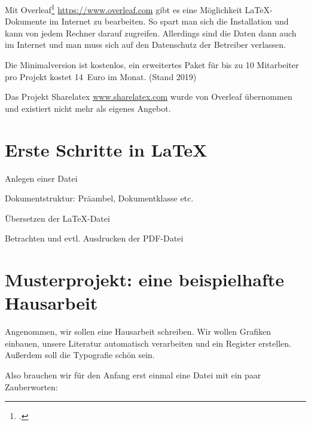 
Mit Overleaf\footcite{meyer:dtk2015/1} \url{https://www.overleaf.com}
gibt es eine Möglichkeit \LaTeX-Dokumente im Internet zu bearbeiten.
So spart man sich die Installation und kann von jedem Rechner darauf zugreifen.
Allerdings sind die Daten dann auch im Internet und man muss sich auf den Datenschutz der Betreiber verlassen.

Die Minimalversion ist kostenlos, ein erweitertes Paket für bis zu 10 Mitarbeiter pro Projekt kostet 14~Euro im Monat.
(Stand 2019)

Das Projekt Sharelatex \url{www.sharelatex.com}  wurde von Overleaf übernommen und existiert
nicht mehr als eigenes Angebot.

\section{Erste Schritte in \LaTeX}

Anlegen einer Datei

Dokumentstruktur: Präambel, Dokumentklasse etc.

Übersetzen der \LaTeX{}-Datei

Betrachten und evtl. Ausdrucken der PDF-Datei


\section{Musterprojekt: eine beispielhafte Hausarbeit}

Angenommen, wir sollen eine Hausarbeit schreiben.
Wir wollen Grafiken einbauen, unsere Literatur automatisch verarbeiten und ein Register erstellen.
Außerdem soll die Typografie schön sein.

Also brauchen wir für den Anfang erst einmal eine Datei mit ein paar Zauberworten:



